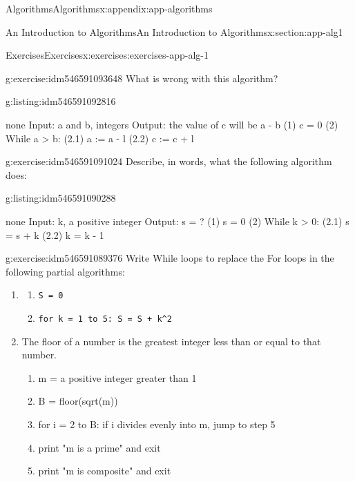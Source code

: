 \documentclass[oneside,10pt,]{book}
\newcommand{\mono}[1]{\texttt{#1}}
\numberwithin{equation}{section}
\begin{document}
\begin{appendixptx}{Algorithms}{}{Algorithms}{}{}{x:appendix:app-algorithms}
\begin{sectionptx}{An Introduction to Algorithms}{}{An Introduction to Algorithms}{}{}{x:section:app-alg1}
\begin{exercises-subsection}{Exercises}{}{Exercises}{}{}{x:exercises:exercises-app-alg-1}
\begin{divisionexercise}{2}{}{}{g:exercise:idm546591093648}
What is wrong with this algorithm?%
\begin{listingptx}{}{g:listing:idm546591092816}{}%
\begin{program}{none}
Input: a and b, integers
Output: the value of c will be a - b
(1) c = 0
(2) While a > b:
		(2.1) a := a - l
		(2.2) c := c + l
\end{program}
\tcblower
\end{listingptx}%
\end{divisionexercise}%
\begin{divisionexercise}{3}{}{}{g:exercise:idm546591091024}%
Describe, in words, what the following algorithm does:%
\begin{listingptx}{}{g:listing:idm546591090288}{}%
\begin{program}{none}
Input: k, a positive integer
Output: s = ?
(1) s = 0
(2) While k > 0:
    (2.1) s = s + k
    (2.2) k = k - 1
\end{program}
\tcblower
\end{listingptx}%
\end{divisionexercise}%
\begin{divisionexercise}{4}{}{}{g:exercise:idm546591089376}%
Write While loops to replace the For loops in the following partial algorithms:%
\par
%
\begin{enumerate}[label=(\alph*)]
\item{}%
\begin{enumerate}[label=(\arabic*)]
\item{}\mono{S = 0}%
\item{}\mono{for k = 1 to 5:  S = S + k\textasciicircum{}2}%
\end{enumerate}
%
\item{}The floor of a number is the greatest integer less than or equal to that number.%
\par
%
\begin{enumerate}[label=(\arabic*)]
\item{}m = a positive integer greater than 1%
\item{}B = floor(sqrt(m))%
\item{}for i = 2 to B: if i divides evenly into m, jump to step 5%
\item{}print "m is a prime" and exit%
\item{}print "m is composite"  and exit%
\end{enumerate}
%
\end{enumerate}
%
\end{divisionexercise}%

\end{exercises-subsection}
\end{sectionptx}
\end{appendixptx}
\end{document}
